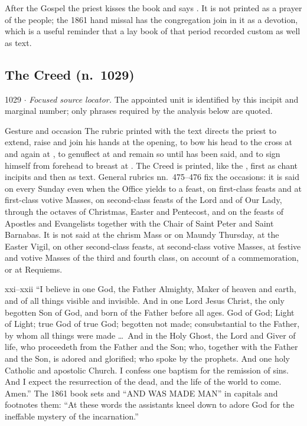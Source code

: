 After the Gospel the priest kisses the book and says . It is not printed as a prayer of the people;
the 1861 hand missal has the congregation join in it as a devotion, which is a
useful reminder that a lay book of that period recorded custom as well as text.

\subsection*{The Creed (n.~1029)}

\begin{appointed}{1029 $\cdot$ }
\textit{Focused source locator.} The appointed unit is identified by this incipit and marginal number; only phrases required by the analysis below are quoted.
\end{appointed}

\begin{rubricnote}{Gesture and occasion}
The rubric printed with the text directs the priest to extend, raise and join
his hands at the opening, to bow his head to the cross at  and
again at , to genuflect at  and remain so until  has been said, and to
sign himself from forehead to breast at .
The Creed is printed, like the , first as chant incipits and
then as text. General rubrics nn.~475--476 fix the occasions: it is said on
every Sunday even when the Office yields to a feast, on first-class feasts and
at first-class votive Masses, on second-class feasts of the Lord and of Our
Lady, through the octaves of Christmas, Easter and Pentecost, and on the feasts
of Apostles and Evangelists together with the Chair of Saint Peter and Saint
Barnabas. It is not said at the chrism Mass or on Maundy Thursday, at the Easter
Vigil, on other second-class feasts, at second-class votive Masses, at festive
and votive Masses of the third and fourth class, on account of a commemoration,
or at Requiems.
\end{rubricnote}

\begin{englishwitness}{xxi--xxii}
``I believe in one God, the Father Almighty, Maker of heaven and earth, and of
all things visible and invisible. And in one Lord Jesus Christ, the only
begotten Son of God, and born of the Father before all ages. God of God; Light
of Light; true God of true God; begotten not made; consubstantial to the
Father, by whom all things were made \dots\ And in the Holy Ghost, the Lord and
Giver of life, who proceedeth from the Father and the Son; who, together with
the Father and the Son, is adored and glorified; who spoke by the prophets. And
one holy Catholic and apostolic Church. I confess one baptism for the remission
of sins. And I expect the resurrection of the dead, and the life of the world to
come. Amen.'' The 1861 book sets  and ``AND WAS
MADE MAN'' in capitals and footnotes them: ``At these words the assistants
kneel down to adore God for the ineffable mystery of the incarnation.''
\end{englishwitness}

